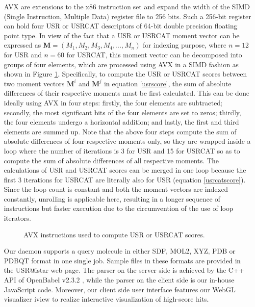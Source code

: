 \documentclass[a4,center,fleqn]{NAR}
\begin{document}
AVX are extensions to the x86 instruction set and expand the width of the SIMD (Single Instruction, Multiple Data) register file to 256 bits. Such a 256-bit register can hold four USR or USRCAT descriptors of 64-bit double precision floating point type. In view of the fact that a USR or USRCAT moment vector can be expressed as $\mathbf M=(M_1, M_2, M_3, M_4, \ldots, M_n)$ for indexing purpose, where $n=12$ for USR and $n=60$ for USRCAT, this moment vector can be decomposed into groups of four elements, which are processed using AVX in a SIMD fashion as shown in Figure \ref{AVX}. Specifically, to compute the USR or USRCAT scores between two moment vectors $\mathbf M^i$ and $\mathbf M^j$ in equation \eqref{usrscore}, the sum of absolute differences of their respective moments must be first calculated. This can be done ideally using AVX in four steps: firstly, the four elements are subtracted; secondly, the most significant bits of the four elements are set to zeros; thirdly, the four elements undergo a horizontal addition; and lastly, the first and third elements are summed up. Note that the above four steps compute the sum of absolute differences of four respective moments only, so they are wrapped inside a loop where the number of iterations is 3 for USR and 15 for USRCAT so as to compute the sum of absolute differences of all respective moments. The calculations of USR and USRCAT scores can be merged in one loop because the first 3 iterations for USRCAT are literally also for USR (equation \eqref{usrcatscore}). Since the loop count is constant and both the moment vectors are indexed constantly, unrolling is applicable here, resulting in a longer sequence of instructions but faster execution due to the circumvention of the use of loop iterators.

\begin{figure}
\begin{center}
\end{center}
\caption{AVX instructions used to compute USR or USRCAT scores.}
\label{AVX}
\end{figure}

Our daemon supports a query molecule in either SDF, MOL2, XYZ, PDB or PDBQT format in one single job. Sample files in these formats are provided in the USR@istar web page. The parser on the server side is achieved by the C++ API of OpenBabel v2.3.2 \cite{968}, while the parser on the client side is our in-house JavaScript code. Moreover, our client side user interface features our WebGL visualizer iview \cite{1366} to realize interactive visualization of high-score hits.
\end{document}
